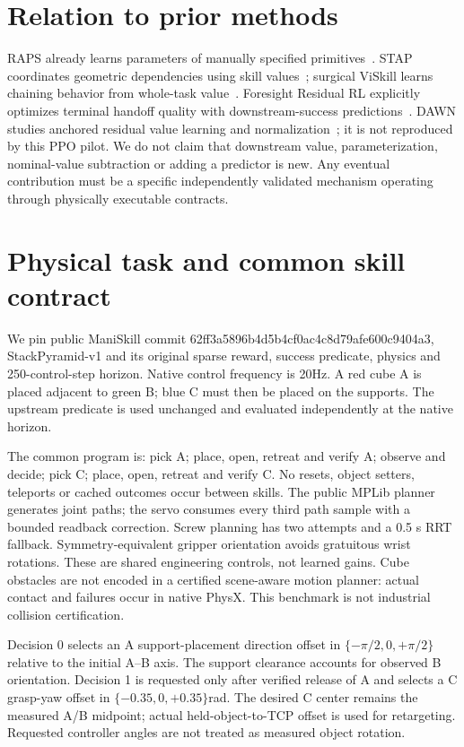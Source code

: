 \documentclass[10pt]{article}
\begin{document}
\section{Relation to prior methods}
RAPS already learns parameters of manually specified primitives~\cite{raps}. STAP coordinates geometric dependencies using skill values~\cite{stap}; surgical ViSkill learns chaining behavior from whole-task value~\cite{viskill}. Foresight Residual RL explicitly optimizes terminal handoff quality with downstream-success predictions~\cite{foresight}. DAWN studies anchored residual value learning and normalization~\cite{dawn}; it is not reproduced by this PPO pilot. We do not claim that downstream value, parameterization, nominal-value subtraction or adding a predictor is new. Any eventual contribution must be a specific independently validated mechanism operating through physically executable contracts.
\section{Physical task and common skill contract}
We pin public ManiSkill commit 62ff3a5896b4d5b4cf0ac4c8d79afe600c9404a3, StackPyramid-v1 and its original sparse reward, success predicate, physics and 250-control-step horizon. Native control frequency is 20Hz. A red cube A is placed adjacent to green B; blue C must then be placed on the supports. The upstream predicate is used unchanged and evaluated independently at the native horizon.

The common program is: pick A; place, open, retreat and verify A; observe and decide; pick C; place, open, retreat and verify C. No resets, object setters, teleports or cached outcomes occur between skills. The public MPLib planner generates joint paths; the servo consumes every third path sample with a bounded readback correction. Screw planning has two attempts and a 0.5 s RRT fallback. Symmetry-equivalent gripper orientation avoids gratuitous wrist rotations. These are shared engineering controls, not learned gains. Cube obstacles are not encoded in a certified scene-aware motion planner: actual contact and failures occur in native PhysX. This benchmark is not industrial collision certification.

Decision 0 selects an A support-placement direction offset in $\{-\pi/2,0,+\pi/2\}$ relative to the initial A--B axis. The support clearance accounts for observed B orientation. Decision 1 is requested only after verified release of A and selects a C grasp-yaw offset in $\{-0.35,0,+0.35\}$rad. The desired C center remains the measured A/B midpoint; actual held-object-to-TCP offset is used for retargeting. Requested controller angles are not treated as measured object rotation.
\end{document}
